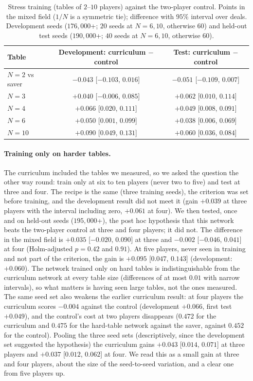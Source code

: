 \documentclass[11pt]{article}
\begin{document}
\begin{table}[ht]\centering\small
\caption{Stress training (tables of $2$--$10$ players) against the two-player control. Points in the mixed field ($1/N$ is a symmetric tie); difference with $95\%$ interval over deals. Development seeds ($176{,}000$+; $20$ seeds at $N=6,10$, otherwise $60$) and held-out test seeds ($190{,}000$+; $40$ seeds at $N=6,10$, otherwise $60$).}\label{tab:estresse}
\begin{tabular}{@{}lcc@{}}\toprule
Table & Development: curriculum $-$ control & Test: curriculum $-$ control\\\midrule
$N=2$ vs saver & $-0.043$ [$-0.103$, $0.016$] & $-0.051$ [$-0.109$, $0.007$]\\
$N=3$ & $+0.040$ [$-0.006$, $0.085$] & $+0.062$ [$0.010$, $0.114$]\\
$N=4$ & $+0.066$ [$0.020$, $0.111$] & $+0.049$ [$0.008$, $0.091$]\\
$N=6$ & $+0.050$ [$0.001$, $0.099$] & $+0.038$ [$0.006$, $0.069$]\\
$N=10$ & $+0.090$ [$0.049$, $0.131$] & $+0.060$ [$0.036$, $0.084$]\\
\bottomrule\end{tabular}\end{table}

\paragraph{Training only on harder tables.} The curriculum included the tables we measured, so we asked the question the other way round: train only at six to ten players (never two to five) and test at three and four. The recipe is the same (three training seeds), the criterion was set before training, and the development result did not meet it (gain $+0.039$ at three players with the interval including zero, $+0.061$ at four). We then tested, once and on held-out seeds ($195{,}000$+), the post hoc hypothesis that this network beats the two-player control at three and four players; it did not. The difference in the mixed field is $+0.035$ [$-0.020$, $0.090$] at three and $-0.002$ [$-0.046$, $0.041$] at four (Holm-adjusted $p=0.42$ and $0.91$). At five players, never seen in training and not part of the criterion, the gain is $+0.095$ [$0.047$, $0.143$] (development: $+0.060$). The network trained only on hard tables is indistinguishable from the curriculum network at every table size (differences of at most $0.01$ with narrow intervals), so what matters is having seen large tables, not the ones measured. The same seed set also weakens the earlier curriculum result: at four players the curriculum scores $-0.004$ against the control (development $+0.066$, first test $+0.049$), and the control's cost at two players disappears ($0.472$ for the curriculum and $0.475$ for the hard-table network against the saver, against $0.452$ for the control). Pooling the three seed sets (descriptively, since the development set suggested the hypothesis) the curriculum gains $+0.043$ [$0.014$, $0.071$] at three players and $+0.037$ [$0.012$, $0.062$] at four. We read this as a small gain at three and four players, about the size of the seed-to-seed variation, and a clear one from five players up.
\end{document}

